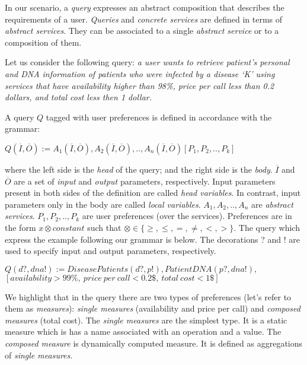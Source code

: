 In our scenario, a \textit{query} expresses an abstract composition that describes the requirements of a user.
\textit{Queries} and \textit{concrete services} are defined in terms of \textit{abstract services}.
They can be associated to a single \textit{abstract service} or to a composition of them.

Let us consider the following query: \textit{a user wants to retrieve patient's personal and DNA information of patients who were infected by a disease `K' using services that have availability higher than 98\%, price per call less than 0.2 dollars, and total cost less then 1 dollar.} 

A query $Q$ tagged with user preferences is defined in accordance with the grammar:
\begin{center}
$Q (\overline{I}, \overline{O}) := A_{1}(\overline{I}, \overline{O}), A_{2}(\overline{I}, \overline{O}), ..,  A_{n}(\overline{I}, \overline{O})[P_{1},P_{2}, .., P_{k}]$
\end{center}
where the left side is the \textit{head} of the query; and the right side is the \textit{body}. 
$\overline{I}$ and $\overline{O}$ are a set of \textit{input} and \textit{output} parameters, respectively.
Input parameters present in both sides of the definition are called \textit{head variables}.
In contrast, input parameters only in the body are called \textit{local variables}.
$A_{1}, A_{2}, .., A_{n}$ are \textit{abstract services}.
$P_{1}, P_{2}, .., P_{k}$ are user preferences (over the services). Preferences are in the form $x \otimes constant$ such that $\otimes \in\lbrace \geq, \leq, =, \neq, <, >\rbrace$.
The query which express the example following our grammar is below.
The decorations ? and ! are used to specify input and output parameters, respectively. 
\begin{small}
\begin{center}
$Q (d?, dna!) := DiseasePatients(d?, p!), PatientDNA(p?, dna!),$ \\
$[availability > 99\%, \ price \ per \ call < 0.2\$, \ total \ cost < 1\$]$
\end{center} 
\end{small}

We highlight that in the query there are two types of preferences (let's refer
to them as \textit{measures}): \textit{single measures} (availability and price per call) and \textit{composed measures} (total cost).
The \textit{single measures} are the simplest type. It is a static measure which is has a name associated with an operation and a value. The\textit{ composed measure} is dynamically computed measure. It is defined as aggregations of \textit{single measures}. 

